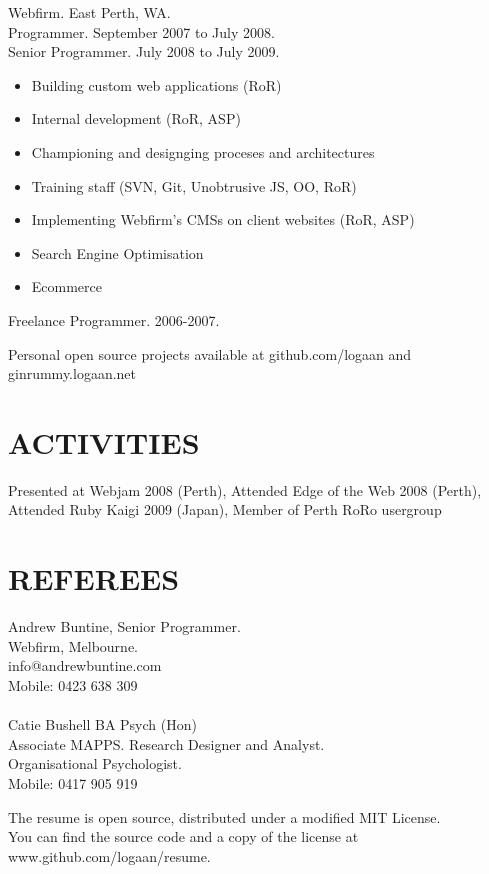 \documentclass[margin]{res}
\begin{document}
\begin{resume}
  Webfirm. East Perth, WA. \\
  Programmer.  September 2007 to July 2008. \\
  Senior Programmer. July 2008 to July 2009.
 \begin{itemize}
  \item Building custom web applications (RoR)
  \item Internal development (RoR, ASP)
  \item Championing and designging proceses and
    architectures
  \item Training staff (SVN, Git, Unobtrusive JS,
    OO, RoR)
  \item Implementing Webfirm's CMSs on client
    websites (RoR, ASP)
  \item Search Engine Optimisation
  \item Ecommerce
  \end{itemize} 

  Freelance Programmer. 2006-2007.

  Personal open source projects available at github.com/logaan and ginrummy.logaan.net

  \section{ACTIVITIES}
  Presented at Webjam 2008 (Perth), Attended Edge of the Web 2008 (Perth), Attended
  Ruby Kaigi 2009 (Japan), Member of Perth RoRo usergroup

  \section{REFEREES}
  Andrew Buntine, Senior Programmer. \\
  Webfirm, Melbourne. \\
  info@andrewbuntine.com \\
  Mobile: 0423 638 309 \\
  \\
  Catie Bushell BA Psych (Hon) \\
  Associate MAPPS. Research Designer and Analyst. \\
  Organisational Psychologist. \\
  Mobile: 0417 905 919 \\

\end{resume} 

\centering
\hspace{-1.75in}  The resume is open source, distributed under a modified MIT License. \\
\hspace{-1.75in}  You can find the source code and a copy of the license at www.github.com/logaan/resume.
\end{document}
